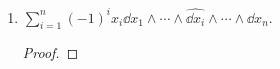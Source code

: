 \documentclass[../psets.tex]{subfiles}
\begin{document}
\begin{enumerate}[label={\textbf{2.4.\roman*.}}]
\begin{enumerate}
\begin{proof}
\begin{align*}
            \end{align*}
        \end{proof}
        \item $\sum_{i=1}^n(-1)^ix_i\dd{x_1}\wedge\cdots\wedge\widehat{\dd{x_i}}\wedge\cdots\wedge\dd{x_n}$.
        \begin{proof}




\end{proof}
\end{enumerate}
\end{enumerate}
\end{document}
